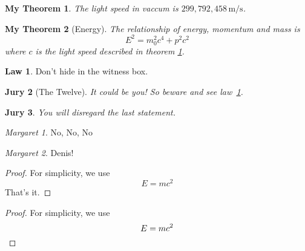 \documentclass{article}
\begin{document}
	\newtheorem{mythm}{My Theorem}[section]
	\begin{mythm}\label{thm:light}
	The light speed in vaccum
	is $299,792,458\,\mathrm{m/s}$.
	\end{mythm}
	\begin{mythm}[Energy]
	The relationship of energy,
	momentum and mass is
	\[E^2 = m_0^2 c^4 + p^2 c^2\]
	where $c$ is the light speed
	described in theorem \ref{thm:light}.
	\end{mythm}

	\theoremstyle{definition} \newtheorem{law}{Law}
	\theoremstyle{plain} \newtheorem{jury}[law]{Jury}
	\theoremstyle{remark} \newtheorem*{mar}{Margaret}
	\begin{law}\label{law:box}
	Don’t hide in the witness box.
	\end{law}
	\begin{jury}[The Twelve]
	It could be you! So beware and
	see law~\ref{law:box}.\end{jury}
	\begin{jury}
	You will disregard the last
	statement.\end{jury}
	\begin{mar}No, No, No\end{mar}
	\begin{mar}Denis!\end{mar}
	\begin{proof}
	For simplicity, we use
	\[
	E=mc^2
	\]
	That’s it.
	\end{proof}
	\begin{proof}
	For simplicity, we use
	\[
	E=mc^2 \qedhere
	\]
	\end{proof}
\end{document}
